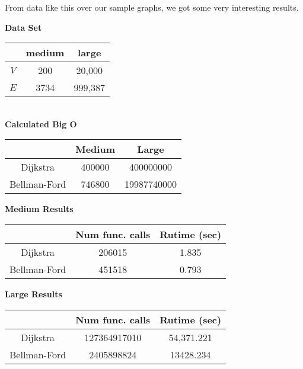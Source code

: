 \documentclass{article}
\begin{document}
From data like this over our sample graphs, we got some very interesting results. 
\pagebreak
\begin{multicols}{2}

\hspace{20 pt} \textbf{Data Set}\\
\centering
\begin{tabular}{||c|c|c||}
\hline
& medium & large \\
\hline
$V$ & 200 & 20,000\\
\hline
$E$ & 3734 & 999,387\\
\hline
\end{tabular}\\

\hspace{5 pt} \textbf{Calculated Big O}\\
\centering
\begin{tabular}{||c|c|c||}
\hline
& Medium & Large \\
\hline
Dijkstra & 400000 &400000000\\
\hline
Bellman-Ford & 746800  & 19987740000\\
\hline
\end{tabular}

\end{multicols}

\vspace{05 pt}

\begin{multicols}{2}
\hspace{20 pt} \textbf{Medium Results}\\
\centering
\begin{tabular}{||c|c|c||}
\hline
& Num func. calls & Rutime (sec) \\
\hline
Dijkstra & 206015 & 1.835\\
\hline
Bellman-Ford & 451518 & 0.793\\
\hline
\end{tabular}


\hspace{05 pt} \textbf{Large Results}\\
\centering
\begin{tabular}{||c|c|c||}
\hline
& Num func. calls & Rutime (sec) \\
\hline
Dijkstra & 127364917010 & 54,371.221 \\
\hline
Bellman-Ford & 2405898824 & 13428.234 \\
\hline
\end{tabular}
\end{multicols}
\end{document}
